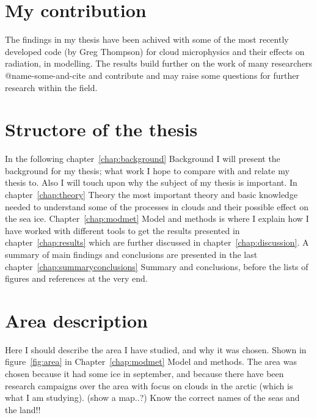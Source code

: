\section{My contribution}
The findings in my thesis have been achived with some of the most recently developed code (by Greg Thompson) for cloud microphysics and their effects on radiation, in modelling. The results build further on the work of many researchers @name-some-and-cite and contribute and may raise some questions for further research within the field.

\section{Structore of the thesis}
In the following chapter~\ref{chap:background} Background I will present the background for my thesis; what work I hope to compare with and relate my thesis to. Also I will touch upon why the subject of my thesis is important. In chapter~\ref{chap:theory} Theory the most important theory and basic knowledge needed to understand some of the processes in clouds and their possible effect on the sea ice. Chapter~\ref{chap:modmet} Model and methods is where I explain how I have worked with different tools to get the results presented in chapter~\ref{chap:results} which are further discussed in chapter~\ref{chap:discussion}. A summary of main findings and conclusions are presented in the last chapter~\ref{chap:summaryconclusions} Summary and conclusions, before the lists of figures and references at the very end.

\section{Area description}
Here I should describe the area I have studied, and why it was chosen. Shown in figure~\ref{fig:area} in Chapter~\ref{chap:modmet} Model and methods.
The area was chosen because it had some ice in september, and because there have been research campaigns over the area with focus on clouds in the arctic (which is what I am studying). (show a map..?) Know the correct names of the seas and the land!!